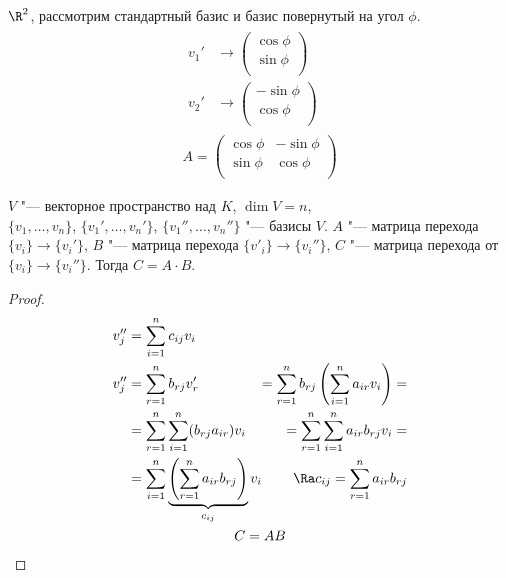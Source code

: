 \begin{exmp}
	$\R^2$, рассмотрим стандартный базис и базис повернутый на угол $\phi$.
	\begin{gather*}
		\begin{aligned}
			v_1' &\to
				\begin{pmatrix}
					\cos \phi\\
					\sin \phi\\
				\end{pmatrix} \\
			v_2' &\to
				\begin{pmatrix}
					-\sin \phi\\
					\cos \phi\\
				\end{pmatrix}
		\end{aligned} \\
		A =
		\begin{pmatrix}
			\cos \phi & -\sin \phi\\
			\sin \phi & \cos \phi\\
		\end{pmatrix}
	\end{gather*}
\end{exmp}

\begin{theorem}
	$V$ "--- векторное пространство над $K$, $\dim V = n$,\\
	$\{v_1, \dots, v_n\}$, $\{v_1', \dots, v_n'\}$, $\{v_1'', \dots, v_n''\}$  "--- базисы $V$.
	$A$ "--- матрица перехода $\{v_i\} \to \{v_i'\}$,
	$B$ "--- матрица перехода $\{v'_i\} \to \{v_i''\}$,
	$C$ "--- матрица перехода от $\{v_i\} \to \{v_i''\}$.
	Тогда $C = A \cdot B$.
\end{theorem}
\begin{proof}
	\begin{gather*}
		\begin{alignedat}{3}
			v_j'' &= \sum_{i = 1}^{n}c_{ij}v_i &\\
			v_j'' &= \sum_{r = 1}^{n}b_{rj}v_r' &= \sum_{r = 1}^{n}b_{rj}\left(\sum_{i = 1}^{n}a_{ir}v_i\right) = \\
			      &= \sum_{r = 1}^{n}\sum_{i = 1}^{n}(b_{rj}a_{ir})v_i &= \sum_{r = 1}^{n}\sum_{i = 1}^{n}a_{ir}b_{rj}v_i = \\
			      &= \sum_{i = 1}^{n}\underbrace{\left(\sum_{r = 1}^{n}a_{ir} b_{rj}\right)}_{c_{ij}} v_i
			        &\Ra c_{ij} = \sum_{r = 1}^{n}a_{ir}b_{rj}
		\end{alignedat} \\
		C = AB
	\end{gather*}
\end{proof}

